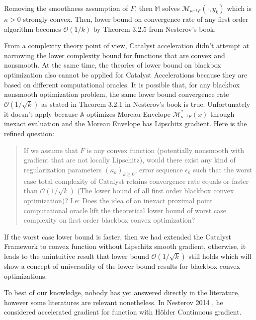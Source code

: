 \documentclass[12pt]{article}
\begin{document}
            Removing the smoothness assumption of $F$, then $\mathbb M$ solves $\mathcal M_{\kappa^{-1}F}(\cdot, y_k)$ which is $\kappa > 0$ strongly convex.
            Then, lower bound on convergence rate of any first order algorithm becomes $\mathcal O(1/k)$ by Theorem 3.2.5 from Nesterov's book. 
            \par
            From a complexity theory point of view, Catalyst acceleration didn't attempt at narrowing the lower complexity bound for functions that are convex and nonsmooth. 
            At the same time, the theories of lower bound on blackbox optimization also cannot be applied for Catalyst Accelerations because they are based on different computational oracles. 
            It is possible that, for any blackbox nonsmooth optimization problem, the same lower bound convergence rate $\mathcal O\left(1/\sqrt{k}\right)$ as stated in Theorem 3.2.1 in Nesterov's book \cite{nesterov_lectures_2018} is true. 
            Unfortunately it doesn't apply because $\mathbb A$ optimizes Moreau Envelope $\mathcal M^*_{\kappa^{-1}F}(x)$ through inexact evaluation and the Moreau Envelope has Lipschitz gradient. 
            Here is the refined question: 
            \begin{quotation}
                If we assume that $F$ is any convex function (potentially nonsmooth with gradient that are not locally Lipschitz), would there exist any kind of regularization parameters $(\kappa_k)_{k \ge 0}$, error sequence $\epsilon_k$ such that the worst case total complexity of Catalyst retains convergence rate equals or faster than $\mathcal O\left(1/\sqrt{k}\right)$ (The lower bound of all first order blackbox convex optimization)? 
                I.e: Does the idea of an inexact proximal point computational oracle lift the theoretical lower bound of worst case complexity on first order blackbox convex optimization? 
            \end{quotation}
            If the worst case lower bound is faster, then we had extended the Catalyst Framework to convex function without Lipschitz smooth gradient, otherwise, it leads to the unintuitive result that lower bound $\mathcal O\left(1/\sqrt{k}\right)$ still holds which will show a concept of universality of the lower bound results for blackbox convex optimizations. 
            \par
            To best of our knowledge, nobody has yet answered directly in the literature, however some literatures are relevant nonetheless. 
            In Nesterov 2014 \cite{nesterov_universal_2015}, he considered accelerated gradient for function with Hölder Continuous gradient.
\end{document}
